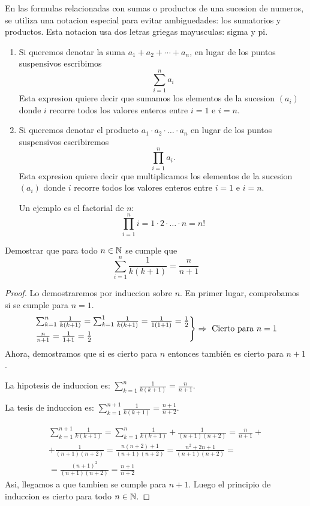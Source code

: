 \begin{definition}
	En las formulas relacionadas con sumas o productos de una sucesion de numeros, se utiliza una notacion especial para evitar ambiguedades: los sumatorios y productos. Esta notacion usa dos letras griegas mayusculas: sigma y pi.
\end{definition}
\begin{enumerate}
	\item Si queremos denotar la suma \(a_1 + a_2 + \cdots + a_n \), en lugar de los puntos suspensivos escribimos
	      \[
		      \sum_{i=1}^{n} a_i
	      \]
	      Esta expresion quiere decir que sumamos los elementos de la sucesion \((a_i )\) donde \(i \) recorre todos los valores enteros entre \(i = 1 \) e \(i = n \).
	\item Si queremos denotar el producto \(a_1 \cdot a_2 \cdot \ldots \cdot  a_n \) en lugar de los puntos suspensivos escribiremos
	      \[
		      \prod\limits_{i=1}^{n } a_i.
	      \]
	      Esta expresion quiere decir que multiplicamos los elementos de la sucesion \((a_i )\) donde \(i \) recorre todos los valores enteros entre \(i = 1\) e \(i = n \).
	      
	      Un ejemplo es el factorial de \( n \):
	      \[
		      \prod\limits_{i =1}^{n} i = 1 \cdot 2 \cdot \ldots \cdot n = n!
	      \]
\end{enumerate}

\begin{example}
	Demostrar que para todo \(n \in  \mathbb{N} \) se cumple que
	\[
		\sum_{i=1}^{n} \frac{1}{k(k+1)} = \frac{n}{n+1}
	\]
\end{example}
\begin{proof}
	Lo demostraremos por induccion sobre \(n \). En primer lugar, comprobamos si se cumple para \(n = 1 \).
	\[
		\begin{rcases}
			\sum_{k =1}^{n } \frac{1}{k(k+1)} = \sum_{k=1}^{1} \frac{1}{k(k+1)} =\frac{1}{1(1+1)} = \frac{1}{2} \\
			\frac{n }{n+1 } = \frac{1}{1+1} = \frac{1}{2}
		\end{rcases} \Rightarrow \text{ Cierto para } n = 1
	\]
	Ahora, demostramos que si es cierto para \(n \) entonces también es cierto para \(n + 1 \).
	
	La hipotesis de induccion es: \(\displaystyle \sum_{k=1}^{n} \frac{1}{k(k+1)} = \frac{n}{n+1}\).
	
	La tesis de induccion es: \(\displaystyle \sum_{k=1}^{n+1} \frac{1}{k(k+1)}  = \frac{n+1}{n+2} \).
	
	\begin{multline*}
		\sum_{k=1}^{n+1} \frac{1}{k(k+1)} = \sum_{k=1}^{n } \frac{1}{k(k+1 )} + \frac{1}{(n+1)(n+2)} = \frac{n }{n+1 } + \\ +  \frac{1}{(n+1)(n+2)}
		= \frac{n(n+2) + 1 }{(n+1)(n+2)} = \frac{n^{2} + 2n + 1 }{(n+1)(n+2)} = \\  = \frac{(n+1)^{2}}{(n+1)(n+2)} = \frac{n + 1}{n + 2}
	\end{multline*}
	Asi, llegamos a que tambien se cumple para \(n+ 1\). Luego el principio de induccion es cierto para todo \( n \in  \mathbb{N} \).
\end{proof}

